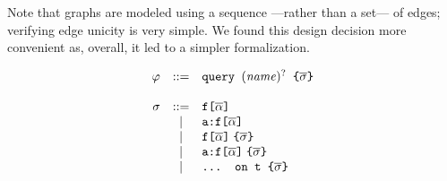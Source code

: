
Note that graphs are modeled using a sequence ---rather than a set---
of edges; verifying edge unicity is very simple.  We found this design
decision more convenient as, overall, it led to a simpler
formalization.

\begin{figure}[t!]
  \centering
  \begin{subfigure}{.5\textwidth}
  \begin{displaymath}
	\begin{array}{rcl}
	\varphi & ::= & \texttt{query } (\mathit{name})^{?} \texttt{ \{}  \overline{\sigma} \texttt{\}} \\
	&& \\
	\sigma & ::= & \texttt{f[}\overline{\alpha}\texttt{]} \\
	& | & \texttt{a:}\texttt{f[}\overline{\alpha}\texttt{]} \\		
	& | & \texttt{f[}\overline{\alpha}\texttt{]}\; \texttt{\{}\overline{\sigma}\texttt{\}} \\
	& | & \texttt{a:}\texttt{f[}\overline{\alpha}\texttt{]}\; \texttt{\{}\overline{\sigma}\texttt{\}} \\
	& | & \texttt{... on t \{}\overline{\sigma}\texttt{\}} \\
	\end{array}
	\end{displaymath}
	

    
  \end{subfigure}%
  \begin{subfigure}{.5\textwidth}

    \begin{verbatim}
    

\end{verbatim}
\end{subfigure}
\end{figure}
